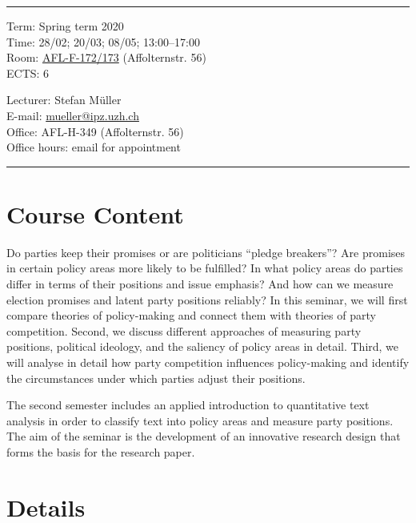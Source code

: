 \documentclass[abstract=on,parskip=full,headings=standardclasses,fontsize=11pt,paper=a4]{scrartcl}
\begin{document}
\hrule
\medskip
\begin{minipage}[t]{0.5\textwidth}
Term: Spring term 2020 \\
Time: 28/02; 20/03; 08/05; 13:00--17:00 \\
Room:  \href{https://www.plaene.uzh.ch/AFL}{AFL-F-172/173} (Affolternstr. 56) \\
ECTS: 6
\end{minipage}
\begin{minipage}[t]{0.49\textwidth}
\begin{flushright}
Lecturer: Stefan Müller \\
E-mail: \href{mailto:mueller@ipz.uzh.ch}{\textsf{mueller@ipz.uzh.ch}} \\
Office:  AFL-H-349 (Affolternstr. 56) \\
Office hours: email for appointment \\
\end{flushright}
\end{minipage}
\medskip
\vspace{2.5mm}
\hrule 
 

\section*{Course Content}

Do parties keep their promises or are politicians ``pledge breakers''? Are promises in certain policy areas more likely to be fulfilled? In what policy areas do parties differ in terms of their positions and issue emphasis? And how can we measure election promises and latent party positions reliably? In this seminar, we will first compare theories of policy-making and connect them with theories of party competition. Second, we discuss different approaches of measuring party positions, political ideology, and the saliency of policy areas in detail. Third, we will analyse in detail how party competition influences policy-making and identify the circumstances under which parties adjust their positions.

The second semester includes an applied introduction to quantitative text analysis in order to classify text into policy areas and measure party positions. The aim of the seminar is the development of an innovative research design that forms the basis for the research paper.


\section*{Details}
\end{document}
